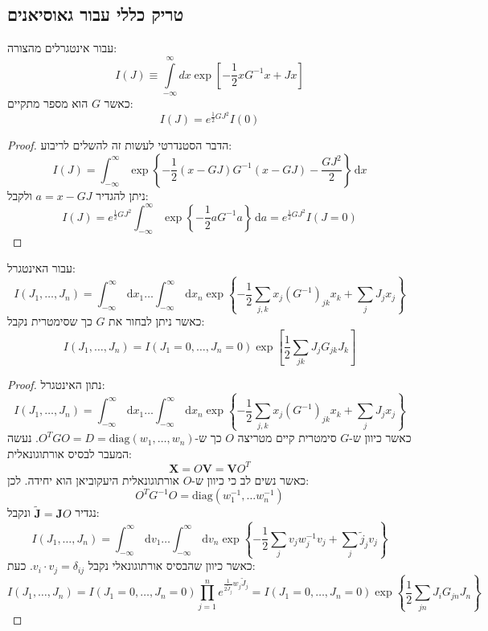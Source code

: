 \documentclass{tstextbook}
\begin{document}
\subsection{טריק כללי עבור גאוסיאנים}

\begin{proposition}
עבור אינטגרלים מהצורה:
$$I\left(J\right)\equiv\int\limits_{-\infty}^{\infty}d x\exp\left[-\frac12x G^{-1}x+J x\right]$$
כאשר \(G\) הוא מספר מתקיים:
$$I(J)=e^{ \frac{1}{2}GJ^{2} }I(0)$$

\end{proposition}
\begin{proof}
הדבר הסטנדרטי לעשות זה להשלים לריבוע:
$$I(J)=\int_{-\infty}^{\infty} \exp \left\{  -\frac{1}{2}(x-GJ) G^{-1}  (x-GJ)-\frac{GJ^{2}}{2} \right\} \, \mathrm{d}x $$
ניתן להגדיר \(a=x-GJ\) ולקבל:
$$I(J)=e^{ \frac{1}{2} GJ^{2} }\int_{-\infty}^{\infty} \exp \left\{  -\frac{1}{2}aG^{-1}  a  \right\} \, \mathrm{d}a =e^{ \frac{1}{2} GJ^{2} }I(J=0)$$

\end{proof}
\begin{proposition}
עבור האינטגרל:
$$I(J_{1},\dots,J_{n})=\int_{-\infty}^{\infty}  \, \mathrm{d}x_{1} \dots \int_{-\infty}^{\infty}  \, \mathrm{d}x_{n}  \exp \left\{  -\frac{1}{2}\sum_{j,k}x_{j}(G^{-1} )_{jk}x_{k} + \sum_{j} J_{j}x_{j}  \right\}$$
כאשר ניתן לבחור את \(G\) כך שסימטרית נקבל:
$$I\left( J_{1},\dots,J_{n} \right)=I\left(J_{1}=0,\ldots,J_{n}=0\right)\exp\left[\frac{1}{2}\sum_{j k}J_{j}G_{j k}J_{k}\right]$$

\end{proposition}
\begin{proof}
נתון האינטגרל:
$$I(J_{1},\dots,J_{n})=\int_{-\infty}^{\infty}  \, \mathrm{d}x_{1} \dots \int_{-\infty}^{\infty}  \, \mathrm{d}x_{n}  \exp \left\{  -\frac{1}{2}\sum_{j,k}x_{j}(G^{-1} )_{jk}x_{k} + \sum_{j} J_{j}x_{j}  \right\}$$
כאשר כיוון ש-\(G\) סימטרית קיים מטריצה \(O\) כך ש-\(O^{T}GO=D=\mathrm{diag}\left( w_{1},\dots,w_{n} \right)\).
נעשה המעבר לבסיס אורתוגונאלית:
$$\mathbf{X}=O\mathbf{V}=\mathbf{V}O^{T}$$
כאשר נשים לב כי כיוון ש-\(O\) אורתוגונאלית היעקוביאן הוא יחידה. לכן:
$$O^{T}G^{-1} O=\text{diag}(w_{1}^{-1} ,\dots w_{n}^{-1} )$$
נגדיר \(\tilde{\mathbf{J}}=\mathbf{J}O\) ונקבל:
$$I(J_{1},\dots,J_{n})=\int_{-\infty}^{\infty}  \, \mathrm{d}v_{1}\dots \int_{-\infty}^{\infty}  \, \mathrm{d}v_{n}\exp \left\{  -\frac{1}{2}\sum_{j} v_{j}w_{j}^{-1} v_{j}+\sum_{j} \tilde{j}_{j}v_{j}  \right\}  $$
כאשר כיוון שהבסיס אורתוגונאלי נקבל \(v_{i}\cdot v_{j}=\delta_{ij}\). כעת:
$$I(J_{1},\dots,J_{n})=I(J_{1}=0,\dots,J_{n}=0)\prod_{j=1}^{n} e^{ \frac{1}{2 \tilde{J}_{j}}w_{j}\tilde{J}_{j}}=I(J_{1}=0,\dots,J_{n}=0)\exp \left\{  \frac{1}{2}\sum_{jn}J_{i}G_{jn}J_{n}  \right\}$$

\end{proof}
\end{document}
